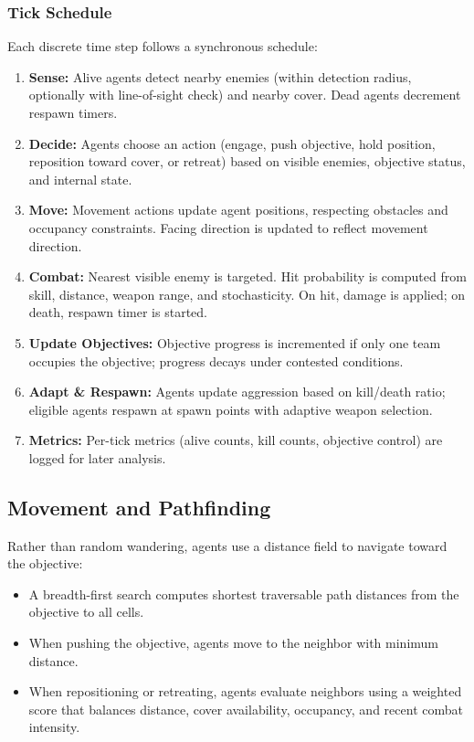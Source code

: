 \documentclass{assignment}
\begin{document}
\subsubsection{Tick Schedule}
Each discrete time step follows a synchronous schedule:
\begin{enumerate}
  \item \textbf{Sense:} Alive agents detect nearby enemies (within detection radius, optionally with line-of-sight check) and nearby cover. Dead agents decrement respawn timers.
  \item \textbf{Decide:} Agents choose an action (engage, push objective, hold position, reposition toward cover, or retreat) based on visible enemies, objective status, and internal state.
  \item \textbf{Move:} Movement actions update agent positions, respecting obstacles and occupancy constraints. Facing direction is updated to reflect movement direction.
  \item \textbf{Combat:} Nearest visible enemy is targeted. Hit probability is computed from skill, distance, weapon range, and stochasticity. On hit, damage is applied; on death, respawn timer is started.
  \item \textbf{Update Objectives:} Objective progress is incremented if only one team occupies the objective; progress decays under contested conditions.
  \item \textbf{Adapt \& Respawn:} Agents update aggression based on kill/death ratio; eligible agents respawn at spawn points with adaptive weapon selection.
  \item \textbf{Metrics:} Per-tick metrics (alive counts, kill counts, objective control) are logged for later analysis.
\end{enumerate}

\subsection{Movement and Pathfinding}

Rather than random wandering, agents use a distance field to navigate toward the objective:
\begin{itemize}
  \item A breadth-first search computes shortest traversable path distances from the objective to all cells.
  \item When pushing the objective, agents move to the neighbor with minimum distance.
  \item When repositioning or retreating, agents evaluate neighbors using a weighted score that balances distance, cover availability, occupancy, and recent combat intensity.
\end{itemize}
\end{document}
